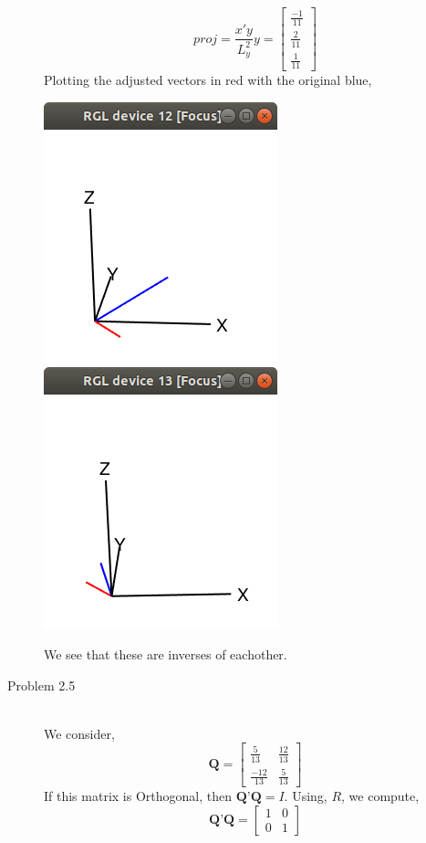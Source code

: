 \documentclass[letterpaper,10pt]{article}
\begin{document}
\begin{description}
\[proj=\frac{x'y}{L_y^2}y=\begin{bmatrix}
\frac{-1}{11}\\
\frac{2}{11}\\
\frac{1}{11}
\end{bmatrix} \]
Plotting the adjusted vectors in red with the original blue,
\begin{center}
\includegraphics[scale=0.5]{1n.png}
\includegraphics[scale=0.5]{1m.png}
\end{center}
We see that these are inverses of eachother.
\item[Problem 2.5]\hfill\\
We consider,
\[\textbf{Q}=\begin{bmatrix}
\frac{5}{13} & \frac{12}{13}\\
\frac{-12}{13} & \frac{5}{13}
\end{bmatrix} \]
If this matrix is Orthogonal, then $\textbf{Q'Q}=I$. Using, $R$, we compute,
\[\textbf{Q'Q}=\begin{bmatrix}
1 & 0\\
0 & 1
\end{bmatrix}\]

\end{description}
\end{document}
